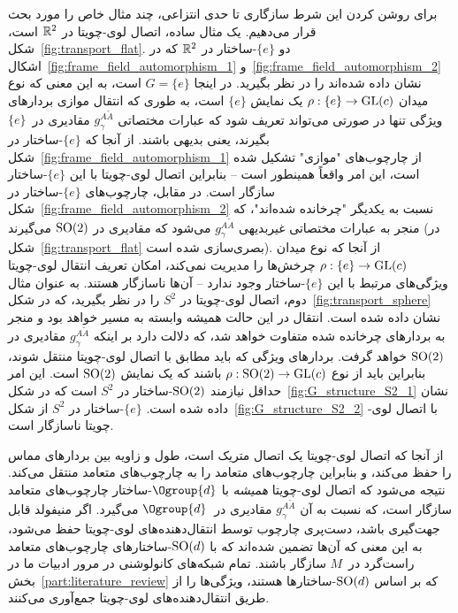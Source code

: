 برای روشن کردن این شرط سازگاری تا حدی انتزاعی، چند مثال خاص را مورد بحث قرار می‌دهیم.
یک مثال ساده، اتصال لوی-چویتا در $\mathbb{R}^2$ است، شکل~\ref{fig:transport_flat}.
دو $\{e\}$-ساختار در $\mathbb{R}^2$ که در اشکال~\ref{fig:frame_field_automorphism_1} و~\ref{fig:frame_field_automorphism_2} نشان داده شده‌اند را در نظر بگیرید.
در اینجا $G=\{e\}$ است، به این معنی که نوع میدان $\rho: \{e\} \to \operatorname{GL}(c)$ یک نمایش $\{e\}$ است، به طوری که انتقال موازی بردارهای ویژگی تنها در صورتی می‌تواند تعریف شود که عبارات مختصاتی $g_\gamma^{A\widetilde{A}}$ مقادیری در~$\{e\}$ بگیرند، یعنی بدیهی باشند.
از آنجا که $\{e\}$-ساختار در شکل~\ref{fig:frame_field_automorphism_1} از چارچوب‌های "موازی" تشکیل شده است، این امر واقعاً همینطور است -- بنابراین اتصال لوی-چویتا با این $\{e\}$-ساختار سازگار است.
در مقابل، چارچوب‌های $\{e\}$-ساختار در شکل~\ref{fig:frame_field_automorphism_2} نسبت به یکدیگر "چرخانده شده‌اند"، که منجر به عبارات مختصاتی غیربدیهی $g_\gamma^{A\widetilde{A}}$ می‌شود که مقادیری در $\operatorname{SO}(2)$ می‌گیرند (در شکل~\ref{fig:transport_flat} بصری‌سازی شده است).
از آنجا که نوع میدان $\rho: \{e\} \to \operatorname{GL}(c)$ چرخش‌ها را مدیریت نمی‌کند، امکان تعریف انتقال لوی-چویتا ویژگی‌های مرتبط با این $\{e\}$-ساختار وجود ندارد -- آن‌ها ناسازگار هستند.
به عنوان مثال دوم، اتصال لوی-چویتا در $S^2$ را در نظر بگیرید، که در شکل~\ref{fig:transport_sphere} نشان داده شده است.
انتقال در این حالت همیشه وابسته به مسیر خواهد بود و منجر به بردارهای چرخانده شده متفاوت خواهد شد، که دلالت دارد بر اینکه $g_\gamma^{A\widetilde{A}}$ مقادیری در $\operatorname{SO}(2)$ خواهد گرفت.
بردارهای ویژگی که باید مطابق با اتصال لوی-چویتا منتقل شوند، بنابراین باید از نوع $\rho: \operatorname{SO}(2) \to \operatorname{GL}(c)$ باشند که یک نمایش $\operatorname{SO}(2)$ است.
این امر حداقل نیازمند $\operatorname{SO}(2)$-ساختار در $S^2$ است که در شکل~\ref{fig:G_structure_S2_1} نشان داده شده است.
$\{e\}$-ساختار در $S^2$ از شکل~\ref{fig:G_structure_S2_2} با اتصال لوی-چویتا ناسازگار است.


از آنجا که اتصال لوی-چویتا یک اتصال متریک است، طول و زاویه بین بردارهای مماس را حفظ می‌کند، و بنابراین چارچوب‌های متعامد را به چارچوب‌های متعامد منتقل می‌کند.
نتیجه می‌شود که اتصال لوی-چویتا \emph{همیشه} با $\Ogroup{d}$-ساختار چارچوب‌های متعامد سازگار است، که نسبت به آن $g_\gamma^{A\widetilde{A}}$ مقادیری در~$\Ogroup{d}$ می‌گیرد.
اگر منیفولد قابل جهت‌گیری باشد، دست‌پری چارچوب توسط انتقال‌دهنده‌های لوی-چویتا حفظ می‌شود، به این معنی که آن‌ها تضمین شده‌اند که با $\operatorname{SO}(d)$-ساختارهای چارچوب‌های متعامد راست‌گرد در~$M$ سازگار باشند.
تمام شبکه‌های کانولوشنی در مرور ادبیات ما در بخش~\ref{part:literature_review} که بر اساس $\operatorname{SO}(d)$-ساختارها هستند، ویژگی‌ها را از طریق انتقال‌دهنده‌های لوی-چویتا جمع‌آوری می‌کنند.


